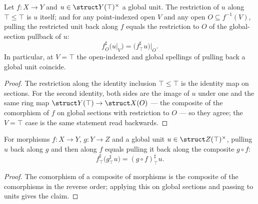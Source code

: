 \begin{lemma}
  \label{pa-lem:global_unit_pullback}
  \leanok

  Let \(f \colon X \to Y\) and \(u \in \struct Y(\top)^{\times}\) a global unit. The restriction
  of \(u\) along \(\top \le \top\) is \(u\) itself; and for any point-indexed open \(V\) and any
  open \(O \subseteq f^{-1}(V)\), pulling the restricted unit back along \(f\) equals the
  restriction to \(O\) of the global-section pullback of \(u\):
  \[
    f^{\sharp}_O\bigl(u|_V\bigr) = \bigl(f^{\sharp}_\top u\bigr)\big|_O .
  \]
  In particular, at \(V = \top\) the open-indexed and global spellings of pulling back a global
  unit coincide.
\end{lemma}
\begin{proof}
  \leanok
  The restriction along the identity inclusion \(\top \le \top\) is the identity map on
  sections. For the second identity, both sides are the image of \(u\) under one and the same
  ring map \(\struct Y(\top) \to \struct X(O)\) — the composite of the comorphism of \(f\) on
  global sections with restriction to \(O\) — so they agree; the \(V = \top\) case is the same
  statement read backwards.
\end{proof}

\begin{lemma}
  \label{pa-lem:units_map_appTop_comp}
  \leanok

  For morphisms \(f \colon X \to Y\), \(g \colon Y \to Z\) and a global unit
  \(u \in \struct Z(\top)^{\times}\), pulling \(u\) back along \(g\) and then along \(f\) equals
  pulling it back along the composite \(g \circ f\):
  \[
    f^{\sharp}_\top\bigl(g^{\sharp}_\top u\bigr) = (g \circ f)^{\sharp}_\top u .
  \]
\end{lemma}
\begin{proof}
  \leanok
  The comorphism of a composite of morphisms is the composite of the comorphisms in the
  reverse order; applying this on global sections and passing to units gives the claim.
\end{proof}

